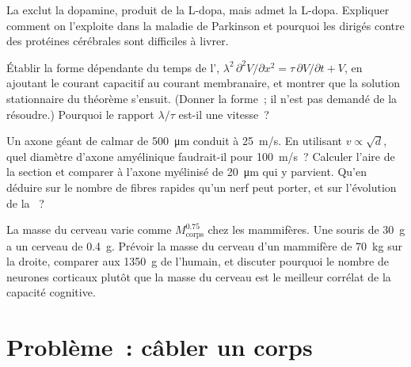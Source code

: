 \begin{exercise}[$\star\star$]\label{exo:b3:nervous-systems:9}
La  exclut la dopamine, produit de la
L-dopa, mais admet la L-dopa. Expliquer comment on l'exploite dans la
maladie de Parkinson et pourquoi les  dirigés contre des
protéines cérébrales sont difficiles à livrer.
\end{exercise}

\begin{exercise}[$\star\star\star$]\label{exo:b3:nervous-systems:10}
Établir la forme dépendante du temps de l',
$\lambda^{2}\,\partial^{2}
V/\partial x^{2} = \tau\,\partial V/\partial t + V$, en ajoutant le
courant capacitif au courant membranaire, et montrer que la solution
stationnaire du théorème s'ensuit. (Donner la forme~; il n'est pas
demandé de la résoudre.) Pourquoi le rapport $\lambda/\tau$ est-il une
vitesse~?
\end{exercise}

\begin{exercise}[$\star\star\star$]\label{exo:b3:nervous-systems:11}
Un axone géant de calmar de \qty{500}{\micro m} conduit à \qty{25}{m/s}.
En utilisant $v \propto \sqrt{d}$, quel diamètre d'axone amyélinique
faudrait-il pour \qty{100}{m/s}~? Calculer l'aire de la section et
comparer à l'axone myélinisé de \qty{20}{\micro m} qui y parvient. Qu'en
déduire sur le nombre de fibres rapides qu'un nerf peut porter, et sur
l'évolution de la ~?
\end{exercise}

\begin{exercise}[$\star\star\star$]\label{exo:b3:nervous-systems:12}
La masse du cerveau varie comme $M_{\text{corps}}^{0.75}$ chez les
mammifères. Une souris de \qty{30}{g} a un cerveau de \qty{0.4}{g}.
Prévoir la masse du cerveau d'un mammifère de \qty{70}{kg} sur la
droite, comparer aux \qty{1350}{g} de l'humain, et discuter pourquoi le
nombre de neurones corticaux plutôt que la masse du cerveau est le
meilleur corrélat de la capacité cognitive.
\end{exercise}

\section{Problème~: câbler un corps}

